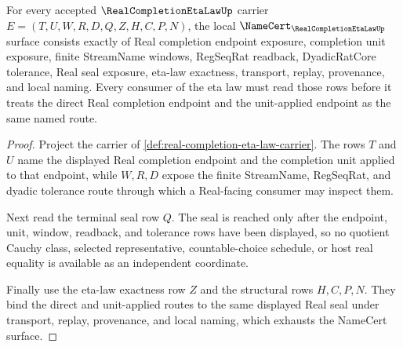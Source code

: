 \begin{theorem}
\label{thm:real-completion-eta-law-namecert-obligations}
For every accepted $\RealCompletionEtaLawUp$ carrier $E=(T,U,W,R,D,Q,Z,H,C,P,N)$, the local $\NameCert_{\RealCompletionEtaLawUp}$ surface consists exactly of Real completion endpoint exposure, completion unit exposure, finite StreamName windows, RegSeqRat readback, DyadicRatCore tolerance, Real seal exposure, eta-law exactness, transport, replay, provenance, and local naming. Every consumer of the eta law must read those rows before it treats the direct Real completion endpoint and the unit-applied endpoint as the same named route.
\end{theorem}
\begin{proof}
Project the carrier of \autoref{def:real-completion-eta-law-carrier}. The rows $T$ and $U$ name the displayed Real completion endpoint and the completion unit applied to that endpoint, while $W,R,D$ expose the finite StreamName, RegSeqRat, and dyadic tolerance route through which a Real-facing consumer may inspect them.

Next read the terminal seal row $Q$. The seal is reached only after the endpoint, unit, window, readback, and tolerance rows have been displayed, so no quotient Cauchy class, selected representative, countable-choice schedule, or host real equality is available as an independent coordinate.

Finally use the eta-law exactness row $Z$ and the structural rows $H,C,P,N$. They bind the direct and unit-applied routes to the same displayed Real seal under transport, replay, provenance, and local naming, which exhausts the NameCert surface.
\end{proof}

